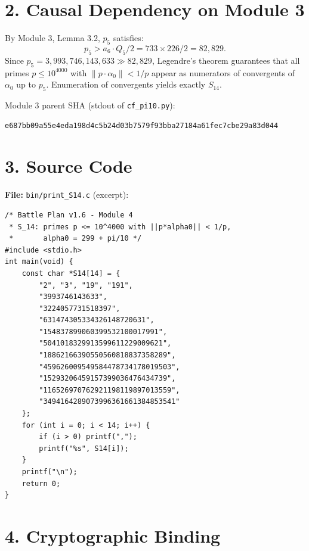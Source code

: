 \documentclass[11pt,letterpaper]{article}
\begin{document}
\section*{2. Causal Dependency on Module 3}

By Module 3, Lemma 3.2, $p_5$ satisfies:
\[
  p_5 > a_6 \cdot Q_5 / 2 = 733 \times 226 / 2 = 82{,}829.
\]
Since $p_5 = 3{,}993{,}746{,}143{,}633 \gg 82{,}829$, Legendre's theorem guarantees
that all primes $p \leq 10^{4000}$ with $\|p \cdot \alpha_0\| < 1/p$ appear as
numerators of convergents of $\alpha_0$ up to $p_5$.
Enumeration of convergents yields exactly $S_{14}$.

\noindent Module 3 parent SHA (stdout of \texttt{cf\_pi10.py}):
\begin{lstlisting}
e687bb09a55e4eda198d4c5b24d03b7579f93bba27184a61fec7cbe29a83d044
\end{lstlisting}

\section*{3. Source Code}

\textbf{File:} \texttt{bin/print\_S14.c} (excerpt):
\begin{lstlisting}
/* Battle Plan v1.6 - Module 4
 * S_14: primes p <= 10^4000 with ||p*alpha0|| < 1/p,
 *       alpha0 = 299 + pi/10 */
#include <stdio.h>
int main(void) {
    const char *S14[14] = {
        "2", "3", "19", "191",
        "3993746143633",
        "3224057731518397",
        "631474305334326148720631",
        "154837899060399532100017991",
        "5041018329913599611229009621",
        "18862166390550560818837358289",
        "459626009549584478734178019503",
        "15293206459157399036476434739",
        "116526970762921198119897013559",
        "3494164289073996361661384853541"
    };
    for (int i = 0; i < 14; i++) {
        if (i > 0) printf(",");
        printf("%s", S14[i]);
    }
    printf("\n");
    return 0;
}
\end{lstlisting}

\section*{4. Cryptographic Binding}
\end{document}
